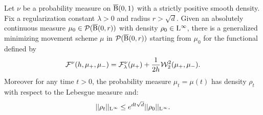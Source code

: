 \begin{thm} \label{thm:existance_gmm_scheme}
Let $\nu$ be a probability measure on $\operatorname{\overline{B}}(0,1)$ with a strictly positive smooth density. Fix a regularization constant $\lambda > 0$ and radius $r > \sqrt{d}$. Given an absolutely continuous measure $\mu_0 \in \mathcal{P}(\operatorname{\overline{B}}(0,r))$ with density $\rho_0 \in \mathrm{L}^{\infty}$, there is a generalized minimizing movement scheme $\mu$ in $\mathcal{P}(\operatorname{\overline{B}}(0,r))$ starting from $\mu_0$ for the functional defined by 
\begin{equation} \label{gmm:sw_ent_functional}
\mathcal{F}^{\nu}(h, \mu_+, \mu_-) = \mathcal{F}^{\nu}_{\lambda}(\mu_+) + \frac{1}{2h}{\cal W}_2^2(\mu_+, \mu_-).
\end{equation}
Moreover for any time $t > 0$, the probability measure $\mu_t = \mu(t)$ has density $\rho_t$ with respect to the Lebesgue measure and:
\begin{equation}
  \label{eq:bound:existance_gmm_scheme}
||\rho_t||_{\mathrm{L}^{\infty}} \leq e^{d t\sqrt{d}} ||\rho_0||_{\mathrm{L}^{\infty}} .  
\end{equation}
\end{thm}
